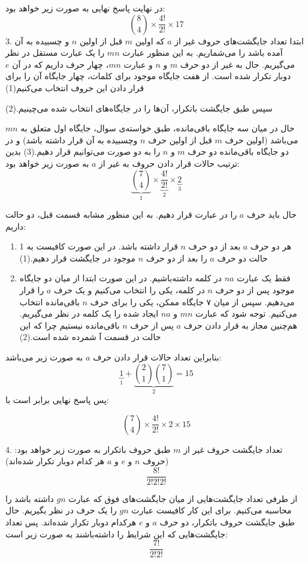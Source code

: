     در نهایت پاسخ نهایی به صورت زیر خواهد بود:
    $${8\choose 4} \times \frac{4!}{2!} \times 17$$
    3.
    \p
    ابتدا تعداد جایگشت‌های  حروف غیر از $a$ که اولین $m$ قبل از اولین $n$ و چسبیده به آن آمده ‌باشد را می‌شماریم.
    به این منظور عبارت $mn$ را یک عبارت مستقل در نظر می‌گیریم.
    حال به غیر از دو حرف $m$ و $n$ و عبارت
     $mn$، 
    چهار حرف داریم که در آن $e$ دوبار تکرار شده است.
    از هفت جایگاه موجود برای کلمات، چهار جایگاه آن را برای قرار دادن این حروف انتخاب می‌کنیم(1)
    
    \p
    سپس طبق جایگشت باتکرار، آن‌ها را در جایگاه‌های انتخاب شده می‌چینیم.(2)
    
    \p
    حال در میان سه جایگاه باقی‌مانده، طبق خواسته‌ی سوال، جایگاه اول متعلق به $mn$ می‌باشد
    (اولین حرف $m$ قبل از اولین حرف $n$ وچسبیده به آن قرار داشته باشد)
    و در دو جایگاه باقی‌مانده دو حرف $m$ و $n$ را به دو صورت می‌توانیم قرار دهیم.(3)
    \p
    بدین ترتیب حالات قرار دادن حروف به غیر از $a$ به صورت زیر خواهد بود:
    $$\underbrace{{7\choose 4}}_{1} \times \underbrace{\frac{4!}{2!}}_{2} \times \underbrace{2}_{3}$$
    
    حال باید حرف $a$ را در عبارت قرار دهیم.
    به این منظور مشابه قسمت قبل، دو حالت داریم:
    \begin{enumerate}
      \item 
      \p
      هر دو حرف $a$ بعد از دو حرف $n$ قرار داشته باشد. در این صورت کافیست به 1 حالت دو حرف $a$ را بعد از دو حرف $n$ موجود در جایگشت قرار دهیم.(1)
      \item
      \p
      فقط یک عبارت $na$ در کلمه داشته‌باشیم. در این صورت ابتدا از میان دو جایگاه موجود پس از دو حرف $n$ در کلمه، یکی را انتخاب می‌کنیم و یک حرف $a$ را قرار می‌دهیم. سپس از میان ۷ جایگاه ممکن، یکی را برای حرف $n$ باقی‌مانده انتخاب می‌کنیم.
      توجه شود که عبارت $mn$ و $na$ ایجاد شده را یک کلمه‌ در نظر می‌گیریم. هم‌چنین مجاز به قرار دادن حرف $a$ پس از حرف $n$ باقی‌مانده نیستیم چرا که این حالت در قسمت آ شمرده شده است.(2)
    \end{enumerate}
    \p
    بنابراین تعداد حالات قرار دادن حرف $a$ به صورت زیر می‌باشد:
    $$\underbrace{1}_{1} + \underbrace{{2\choose 1}{7\choose 1}}_{2} = 15$$ 
    پس پاسخ نهایی برابر است با:
    
    $${7\choose 4} \times \frac{4!}{2!} \times 2 \times 15$$

    4.
    \p
    تعداد جایگشت حروف غیر از $m$
    طبق حروف باتکرار به صورت زیر خواهد بود:
    (حروف $n$ و $e$ و $a$ هر کدام دوبار تکرار شده‌اند)
    $$\frac{8!}{2!2!2!}$$
    
    از طرفی تعداد جایگشت‌هایی از میان جایگشت‌های فوق که عبارت $gn$ داشته باشد را محاسبه می‌کنیم. برای این کار کافیست عبارت $gn$ را یک حرف در نظر بگیریم. حال طبق جایگشت حروف باتکرار، دو حرف $a$ و $e$ هرکدام دوبار تکرار شده‌اند. پس تعداد جایگشت‌هایی که این شرایط را داشته‌باشند به صورت زیر است:
    $$\frac{7!}{2!2!}$$
    

